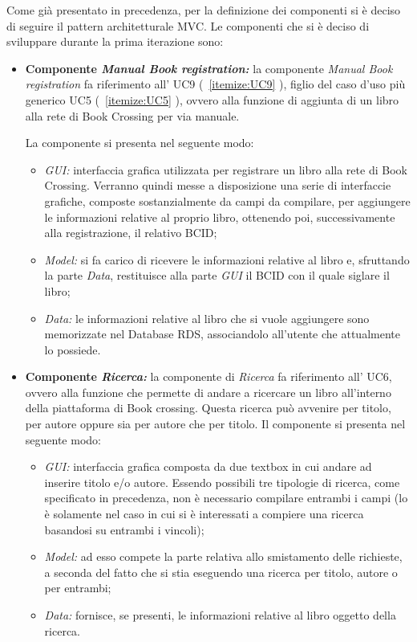 Come già presentato in precedenza, per la definizione dei componenti si è deciso di seguire il pattern architetturale MVC. 
Le componenti che si è deciso di sviluppare durante la prima iterazione sono: 
\begin{itemize}
	\item \textbf{Componente \textit{Manual Book registration:}} la componente \textit{Manual Book registration} fa riferimento all’ UC9 (~\ref{itemize:UC9} ), figlio del caso d'uso più generico UC5 (~\ref{itemize:UC5} ), ovvero alla funzione di aggiunta di un libro alla rete di Book Crossing per via manuale. 
	
	La componente si presenta nel seguente modo:
	\begin{itemize}
		\item \textit{GUI:} interfaccia grafica utilizzata per registrare un libro alla rete di Book Crossing. Verranno quindi messe a disposizione una serie di interfaccie grafiche, composte sostanzialmente da campi da compilare, per aggiungere le informazioni relative al proprio libro, ottenendo poi, successivamente alla registrazione, il relativo BCID;
		\item \textit{Model:} si fa carico di ricevere le informazioni relative al libro e, sfruttando la parte \textit{Data}, restituisce alla parte \textit{GUI} il BCID con il quale siglare il libro;
		\item \textit{Data:} le informazioni relative al libro che si vuole aggiungere sono memorizzate nel Database RDS, associandolo all'utente che attualmente lo possiede. 
	\end{itemize}
	\item \textbf{Componente \textit{Ricerca:}}  la componente di \textit{Ricerca} fa riferimento all’ UC6,
	ovvero alla funzione che permette di andare a ricercare un libro all'interno della piattaforma di Book crossing.
	Questa ricerca può avvenire per titolo, per autore oppure sia per autore che per titolo. Il componente si presenta nel seguente modo:
	\begin{itemize}
		\item \textit{GUI:} interfaccia grafica composta da due textbox in cui andare ad inserire titolo e/o autore. Essendo possibili tre tipologie di ricerca, come specificato in precedenza, non è necessario compilare entrambi i campi (lo è solamente nel caso in cui si è interessati a compiere una ricerca basandosi su entrambi i vincoli);
		\item \textit{Model:} ad esso compete la parte relativa allo smistamento delle richieste, a seconda del fatto che si stia eseguendo una ricerca per titolo, autore o per entrambi;
		\item \textit{Data:} fornisce, se presenti, le informazioni relative al libro oggetto della ricerca.
	\end{itemize}
\end{itemize}